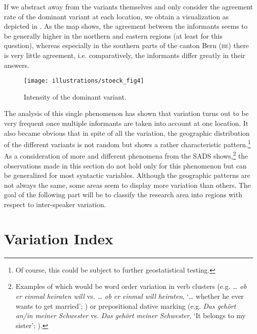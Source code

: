 \documentclass[output=paper]{LSP/langsci}
\begin{document}
If we abstract away from the variants themselves and only consider the agreement rate of the dominant variant at each location, we obtain a visualization as depicted in . As the map shows, the agreement between the informants seems to be generally higher in the northern and eastern regions (at least for this question), whereas especially in the southern parts of the canton Bern (\textsc{be}) there is very little agreement, i.e. comparatively, the informants differ greatly in their answers.
  
\begin{figure}
\texttt{[image: illustrations/stoeck\_fig4]}
\caption{Intensity of the dominant variant.}
\label{fig:stoeck:4}
\end{figure}
 
The analysis of this single phenomenon has shown that variation turns out to be very frequent once multiple informants are taken into account at one location. It also became obvious that in spite of all the variation, the geographic distribution of the different variants is not random but shows a rather characteristic pattern.\footnote{ Of course, this could be subject to further geostatistical testing.} As a consideration of more and different phenomena from the SADS shows,\footnote{ Examples of which would be word order variation in verb clusters (e.g. \emph{… ob er einmal heiraten will} vs. \emph{… ob er einmal will heiraten}, ‘… whether he ever wants to get married’; \citealt{seiler_three_2004}) or prepositional dative marking (e.g. \emph{Das gehört an/in meiner Schwester} vs. \emph{Das gehört meiner Schwester}, ‘It belongs to my sister’; \citealt{seiler_prapositionale_2003}).} the observations made in this section do not hold only for this phenomenon but can be generalized for most syntactic variables. Although the geographic patterns are not always the same, some areas seem to display more variation than others. The goal of the following part will be to classify the research area into regions with respect to inter-speaker variation.

\section{Variation Index}
\end{document}
